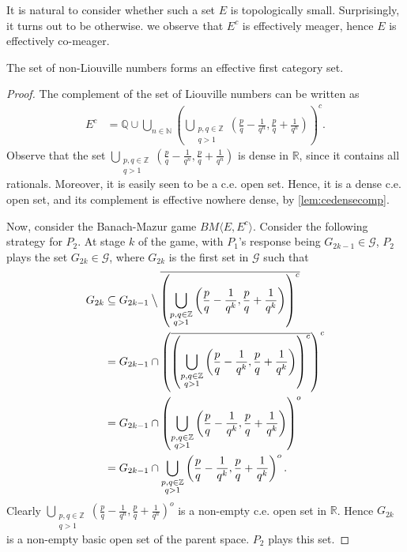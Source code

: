 \documentclass[a4paper,UKenglish,autoref,thm-restate,numberwithinsect]{lipics-v2021}
\newcommand{\N}{\mathbb{N}}
\begin{document}
It is natural to consider whether such a set $E$ is topologically
small. Surprisingly, it turns out to be otherwise. we observe that
$E^c$ is effectively meager, hence $E$ is effectively co-meager.

\begin{theorem}
	The set of non-Liouville numbers forms an effective first category set. 
\end{theorem}
\begin{proof}
The complement of the set of Liouville numbers can be written as
\begin{align*}
  E^c&=\mathbb{Q} \cup \bigcup_{n\in\N}
       \left(\bigcup_{\substack{p,q\in\mathbb{Z}\\q>1}}
  \left(\frac{p}{q}-\frac{1}{q^n},\frac{p}{q}+\frac{1}{q^n}\right)\right)^c.  
\end{align*} 
Observe that the set
$\bigcup_{\substack{p,q\in\mathbb{Z}\\q>1}}\left(\frac{p}{q}-\frac{1}{q^n},\frac{p}{q}+\frac{1}{q^n}\right)$ 
is dense in $\mathbb{R}$, since it contains all rationals. Moreover,
it is easily seen to be a c.e. open set. Hence, it is a dense c.e.
open set, and its complement is effective nowhere dense, by
\cref{lem:cedensecomp}.

Now, consider the Banach-Mazur game $BM\langle E,E^c \rangle$.
Consider the following strategy for $P_2$. At stage $k$ of the game,
with $P_1$'s response being $G_{2k-1}\in\mathcal{G}$, $P_2$ plays the
set $G_{2k}\in\mathcal{G}$, where $G_{2k}$ is the first set in
$\mathcal{G}$ such that
\begin{align*}
  G_{2k}&\subseteq G_{2k-1}\mathbin{\big\backslash}\overline{\left(\bigcup_{\substack{p,q\in\mathbb{Z}\\q>1}}\left(\frac{p}{q}-\frac{1}{q^k},\frac{p}{q}+\frac{1}{q^k}\right)\right)^c}\\
	&=G_{2k-1}\cap\left(\overline{\left(\bigcup_{\substack{p,q\in\mathbb{Z}\\q>1}}\left(\frac{p}{q}-\frac{1}{q^k},\frac{p}{q}+\frac{1}{q^k}\right)\right)^c}\right)^c\\
	&=G_{2k-1}\cap\left(\bigcup_{\substack{p,q\in\mathbb{Z}\\q>1}}\left(\frac{p}{q}-\frac{1}{q^k},\frac{p}{q}+\frac{1}{q^k}\right)\right)^o\\
	&=G_{2k-1}\cap\bigcup_{\substack{p,q\in\mathbb{Z}\\q>1}}\left(\frac{p}{q}-\frac{1}{q^k},\frac{p}{q}+\frac{1}{q^k}\right)^o.
\end{align*}
Clearly
$\bigcup_{\substack{p,q\in\mathbb{Z}\\q>1}}\left(\frac{p}{q}-\frac{1}{q^n},\frac{p}{q}+\frac{1}{q^n}\right)^o$
is a non-empty c.e. open set in $\mathbb{R}$. Hence $G_{2k}$ is a
non-empty basic open set of the parent space. $P_2$ plays this set.


\end{proof}
\end{document}
